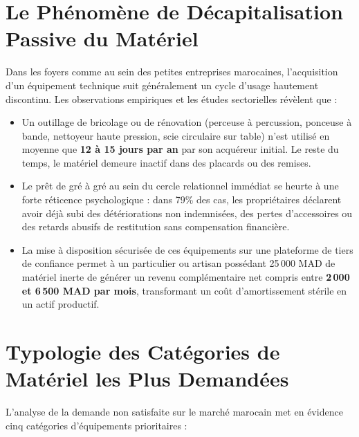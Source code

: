 \documentclass[11pt,a4paper]{report}
\begin{document}
\section{Le Phénomène de Décapitalisation Passive du Matériel}
Dans les foyers comme au sein des petites entreprises marocaines, l'acquisition d'un équipement technique suit généralement un cycle d'usage hautement discontinu. Les observations empiriques et les études sectorielles révèlent que :
\begin{itemize}[leftmargin=*]
    \item Un outillage de bricolage ou de rénovation (perceuse à percussion, ponceuse à bande, nettoyeur haute pression, scie circulaire sur table) n'est utilisé en moyenne que \textbf{12 à 15 jours par an} par son acquéreur initial. Le reste du temps, le matériel demeure inactif dans des placards ou des remises.
    \item Le prêt de gré à gré au sein du cercle relationnel immédiat se heurte à une forte réticence psychologique : dans 79\% des cas, les propriétaires déclarent avoir déjà subi des détériorations non indemnisées, des pertes d'accessoires ou des retards abusifs de restitution sans compensation financière.
    \item La mise à disposition sécurisée de ces équipements sur une plateforme de tiers de confiance permet à un particulier ou artisan possédant 25\,000 MAD de matériel inerte de générer un revenu complémentaire net compris entre \textbf{2\,000 et 6\,500 MAD par mois}, transformant un coût d'amortissement stérile en un actif productif.
\end{itemize}

\section{Typologie des Catégories de Matériel les Plus Demandées}
L'analyse de la demande non satisfaite sur le marché marocain met en évidence cinq catégories d'équipements prioritaires :
\end{document}
